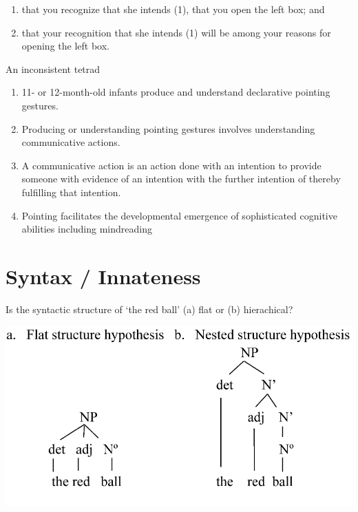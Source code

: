 \documentclass[12pt]{extarticle}
\begin{document}
\begin{multicols}{3}
\begin{enumerate}
\item

that you recognize that she intends (1), that you open the left box; and

\item

that your recognition that she intends (1) will be among your reasons for opening the left box.
\end{enumerate}

An inconsistent tetrad
\begin{enumerate}
\item 11- or 12-month-old infants produce and understand declarative pointing gestures.
\item Producing or understanding pointing gestures involves understanding communicative actions.
\item A communicative action is
  an action done with an intention to provide someone with evidence of an intention with the
  further intention of thereby fulfilling that intention.
\item Pointing facilitates the developmental emergence of sophisticated cognitive abilities
including mindreading
\end{enumerate}



\section{Syntax / Innateness}

Is the syntactic structure of ‘the red ball’ (a) flat or (b) hierachical?

\begin{center}

\includegraphics[scale=0.25]{../www.slides/src/raw/img/lidz_2003_fig0.neg.png}

\end{center}


\end{multicols}
\end{document}
